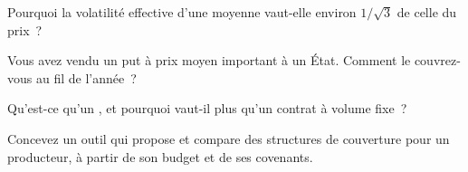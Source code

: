 \begin{interviewq}\label{iq:m3:commodity-options-and-structured-hedges:3}
Pourquoi la volatilité effective d'une moyenne vaut-elle environ $1/\sqrt3$ de celle du prix~?
\end{interviewq}

\begin{interviewq}\label{iq:m3:commodity-options-and-structured-hedges:4}
Vous avez vendu un put à prix moyen important à un État. Comment le couvrez-vous au fil de l'année~?
\end{interviewq}

\begin{interviewq}\label{iq:m3:commodity-options-and-structured-hedges:5}
Qu'est-ce qu'un , et pourquoi vaut-il plus qu'un contrat à volume fixe~?
\end{interviewq}

\begin{interviewq}\label{iq:m3:commodity-options-and-structured-hedges:6}
Concevez un outil qui propose et compare des structures de couverture pour un producteur, à partir de son budget et de ses covenants.
\end{interviewq}
